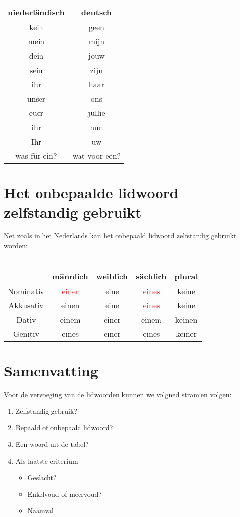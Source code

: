 \documentclass[main.tex]{subfiles}
\begin{document}
\begin{tabular}{|c|c|}
\hline 
\rowcolor{gray}
niederländisch & deutsch \\ 
\hline 
kein & geen \\ 
\hline 
mein & mijn \\ 
\hline 
dein & jouw \\ 
\hline 
sein & zijn \\ 
\hline 
ihr & haar \\ 
\hline 
unser & ons \\ 
\hline 
euer & jullie \\ 
\hline 
ihr & hun \\ 
\hline 
Ihr & uw \\ 
\hline 
was für ein? & wat voor een? \\ 
\hline 
\end{tabular} 

\section{Het onbepaalde lidwoord zelfstandig gebruikt}
Net zoals in het Nederlands kan het onbepaald lidwoord zelfstandig gebruikt worden:
\\
\\
\begin{tabular}{|c|c|c|c|c|}
\hline 
\rowcolor{gray}
& männlich & weiblich & sächlich & plural \\ 
\hline 
\cellcolor[gray]{0.8}Nominativ & \textcolor{red}{einer} & eine & \textcolor{red}{eines} & keine \\ 
\hline 
\cellcolor[gray]{0.8}Akkusativ & einen & eine & \textcolor{red}{eines} & keine \\ 
\hline 
\cellcolor[gray]{0.8}Dativ & einem & einer & einem & keinen \\ 
\hline 
\cellcolor[gray]{0.8}Genitiv & eines & einer & eines & keiner \\ 
\hline 
\end{tabular} 

\section{Samenvatting}
Voor de vervoeging van de lidwoorden kunnen we volgned stramien volgen:
\begin{enumerate}
\item Zelfstandig gebruik?
\item Bepaald of onbepaald lidwoord?
\item Een woord uit de tabel?
\item Als laatste criterium
	\begin{itemize}
	\item Geslacht?
	\item Enkelvoud of meervoud?
	\item Naamval
	\end{itemize}
\end{enumerate}
\end{document}
